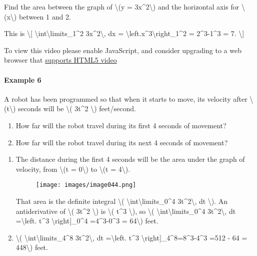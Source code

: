 Find the area between the graph of \textbackslash{}(y =
3x\^{}2\textbackslash{}) and the horizontal axis for
\textbackslash{}(x\textbackslash{}) between 1 and 2.

This is \textbackslash{}{[}
\textbackslash{}int\textbackslash{}limits\_1\^{}2
3x\^{}2\textbackslash{}, dx =
\textbackslash{}left.x\^{}3\textbackslash{}right\textbar{}\_1\^{}2 =
2\^{}3-1\^{}3 = 7. \textbackslash{}{]}

To view this video please enable JavaScript, and consider upgrading to a
web browser that \href{http://videojs.com/html5-video-support/}{supports
HTML5 video}

\hypertarget{example-6}{%
\paragraph{Example 6}\label{example-6}}

A robot has been programmed so that when it starts to move, its velocity
after \textbackslash{}(t\textbackslash{}) seconds will be
\textbackslash{}( 3t\^{}2 \textbackslash{}) feet/second.

\begin{enumerate}
\tightlist
\item
  How far will the robot travel during its first 4 seconds of movement?
\item
  How far will the robot travel during its next 4 seconds of movement?
\end{enumerate}

\begin{enumerate}
\item
  The distance during the first 4 seconds will be the area under the
  graph of velocity, from \textbackslash{}(t = 0\textbackslash{}) to
  \textbackslash{}(t = 4\textbackslash{}).

  \begin{figure}
  \centering
  \texttt{[image: images/image044.png]}
  \caption{}
  \end{figure}

  That area is the definite integral \textbackslash{}(
  \textbackslash{}int\textbackslash{}limits\_0\^{}4
  3t\^{}2\textbackslash{}, dt \textbackslash{}). An antiderivative of
  \textbackslash{}( 3t\^{}2 \textbackslash{}) is \textbackslash{}(
  t\^{}3 \textbackslash{}), so \textbackslash{}(
  \textbackslash{}int\textbackslash{}limits\_0\^{}4
  3t\^{}2\textbackslash{}, dt =\textbackslash{}left. t\^{}3
  \textbackslash{}right{]}\_0\^{}4 =4\^{}3-0\^{}3 = 64\textbackslash{})
  feet.
\item
  \textbackslash{}( \textbackslash{}int\textbackslash{}limits\_4\^{}8
  3t\^{}2\textbackslash{}, dt =\textbackslash{}left. t\^{}3
  \textbackslash{}right{]}\_4\^{}8=8\^{}3-4\^{}3 =512 - 64 =
  448\textbackslash{}) feet.
\end{enumerate}

